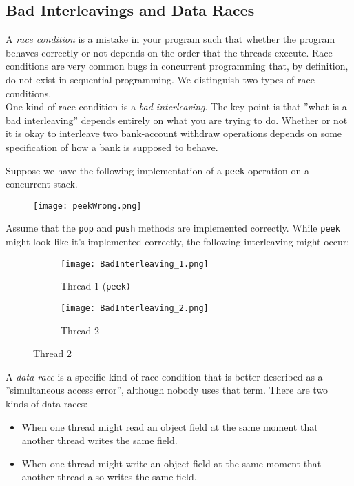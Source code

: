 \documentclass[main]{subfiles}
\begin{document}
\subsection{Bad Interleavings and Data Races}
A \textit{race condition} is a mistake in your program such that whether the program behaves correctly or not depends on the order that the threads execute. Race conditions are very common bugs in concurrent programming that, by definition, do not exist in sequential programming. We distinguish two types of race conditions.\\[3mm]
One kind of race condition is a \textit{bad interleaving}. The key point is that ''what is a bad interleaving'' depends entirely on what you are trying to do. Whether or not it is okay to interleave two bank-account withdraw operations depends on some specification of how a bank is supposed to behave.
\begin{example}
    Suppose we have the following implementation of a \texttt{peek} operation on a concurrent stack.
    \begin{figure}[H]
        \centering
        \texttt{[image: peekWrong.png]}
    \end{figure}
    \noindent Assume that the \texttt{pop} and \texttt{push} methods are implemented correctly. While \texttt{peek} might look like it's implemented correctly, the following interleaving might occur:
    \begin{figure}[H]
        \centering
        \begin{subfigure}{.5\textwidth}
            \centering
            \texttt{[image: BadInterleaving\_1.png]}
            \captionsetup{labelformat=empty}
            \caption{Thread 1 (\texttt{peek)}}
        \end{subfigure}%
        \begin{subfigure}{.5\textwidth}
            \centering
            \texttt{[image: BadInterleaving\_2.png]}
            \captionsetup{labelformat=empty}
            \caption{Thread 2}
        \end{subfigure}
    \end{figure}
\end{example}
A \textit{data race} is a specific kind of race condition that is better described as a ''simultaneous access error'', although nobody uses that term. There are two kinds of data races:
\begin{itemize}
    \item When one thread might read an object field at the same moment that another thread writes the same field.
    \item When one thread might write an object field at the same moment that another thread also writes the same field.
\end{itemize}
\end{document}
